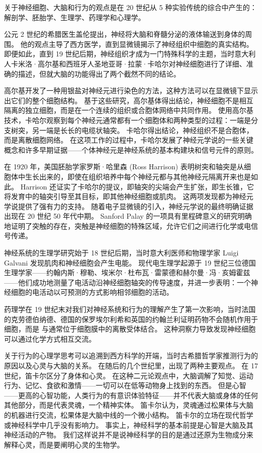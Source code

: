 关于神经细胞、大脑和行为的观点是在 20 世纪从 5 种实验传统的综合中产生的：解剖学、胚胎学、生理学、药理学和心理学。


公元 2 世纪的希腊医生盖伦提出，神经将大脑和脊髓分泌的液体输送到身体的周围。
他的观点主导了西方医学，直到显微镜揭示了神经组织中细胞的真实结构。
即便如此，直到 19 世纪后期，神经组织才成为一门特殊科学的主题，当时意大利人卡米洛·高尔基和西班牙人圣地亚哥·拉蒙·卡哈尔对神经细胞进行了详细、准确的描述，但就大脑的功能得出了两个截然不同的结论。


高尔基开发了一种用银盐对神经元进行染色的方法，这种方法可以在显微镜下显示出它们的整个细胞结构。
基于这些研究，高尔基体得出结论，神经细胞不是相互隔离的独立细胞，而是在一个连续的组织或合胞体网络中共同作用。
使用高尔基技术，卡哈尔观察到每个神经元通常都有一个细胞体和两种类型的过程：一端是分支树突，另一端是长长的电缆状轴突。 
卡哈尔得出结论，神经组织不是合胞体，而是离散细胞网络。
在这项工作的过程中，卡哈尔发展了神经元学说的一些关键概念和许多早期证据——个体神经元是神经系统的基本构建块和信号元件的原则。


在 1920 年，美国胚胎学家罗斯·哈里森 (Ross Harrison) 表明树突和轴突是从细胞体中生长出来的，即使在组织培养中每个神经元都与其他神经元隔离开来也是如此。
Harrison 还证实了卡哈尔的提议，即轴突的尖端会产生扩张，即生长锥，它将发育中的轴突引导至其目标，即其他神经细胞或肌肉。
这两项发现都为神经元学说提供了强有力的支持。
随着电子显微镜的引入，神经元学说的最终明确证据出现在 20 世纪 50 年代中期。
Sanford Palay 的一项具有里程碑意义的研究明确地证明了突触的存在，突触是神经细胞的特殊区域，允许它们之间进行化学或电信号传递。


神经系统的生理学研究始于 18 世纪后期，当时意大利医师和物理学家 Luigi Galvani 发现肌肉和神经细胞会产生电能。
现代电生理学起源于 19 世纪三位德国生理学家——约翰内斯·穆勒、埃米尔·杜布瓦·雷蒙德和赫尔曼·冯·亥姆霍兹——他们成功地测量了电活动沿神经细胞轴突的传导速度，并进一步表明：一个神经细胞的电活动以可预测的方式影响相邻细胞的活动。


药理学在 19 世纪末对我们对神经系统和行为的理解产生了第一次影响，当时法国的克劳德伯纳德、德国的保罗埃尔利希和英国的约翰兰利证明药物不会随机作用于细胞，而是 与通常位于细胞膜中的离散受体结合。 
这种洞察力导致发现神经细胞可以通过化学方式相互交流。


关于行为的心理学思考可以追溯到西方科学的开端，当时古希腊哲学家推测行为的原因以及心灵与大脑的关系。
在随后的几个世纪里，出现了两种主要观点。
在 17 世纪，笛卡尔区分了身体和心灵。
在这种二元论观点中，大脑调解了知觉、运动行为、记忆、食欲和激情——一切可以在低等动物身上找到的东西。
但是心智——更高的心智功能，人类行为的有意识体验特征——并不代表大脑或身体的任何其他部分，而是代表灵魂，一个精神实体。
笛卡尔认为，灵魂通过松果体与大脑的机器进行交流，松果体是大脑中线的一个微小结构。
笛卡尔的立场在现代哲学或神经科学中几乎没有影响力。 事实上，神经科学的基本前提是心智是大脑及其神经活动的产物。
我们这样说并不是说神经科学的目的是通过还原为生物成分来解释心灵，而是要阐明心灵的生物学。


